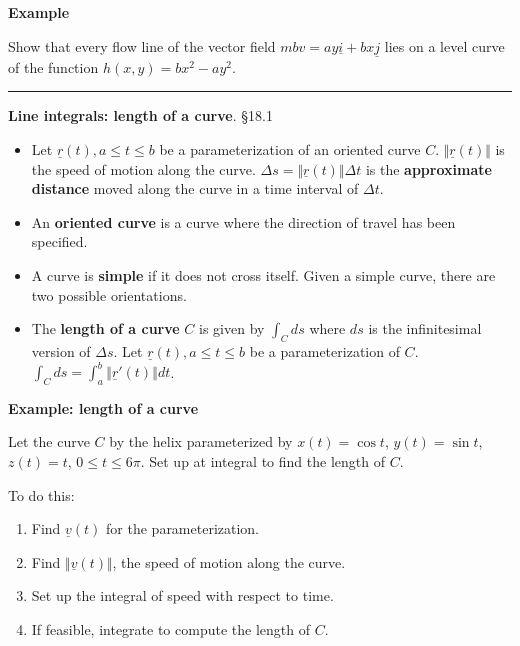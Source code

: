 \documentclass[12pt,letterpaper,noanswers]{exam}
\newcommand{\mb}[1]{\underline{#1}}
\begin{document}
\noindent\textbf{Example}

Show that every flow line of the vector field $mb v = ay\mb i + bx\mb j$ lies on a level curve of the function $h(x,y) = bx^2-ay^2$.
\vfill





\eject


\vspace{0.2cm}
\hrule
\vspace{0.2cm}

\noindent\textbf{Line integrals: length of a curve}.  \S 18.1  
\begin{tcolorbox}
\begin{itemize}
\itemsep0em
    \item Let $\mb r(t), a\leq t\leq b$ be a parameterization of an oriented curve $C$.  $\Vert \mb r(t)\Vert$ is the speed of motion along the curve.  $\Delta s = \Vert\mb r(t)\Vert \Delta t$ is the \textbf{approximate distance} moved along the curve in a time interval of $\Delta t$.
    \item An \textbf{oriented curve} is a curve where the direction of travel has been specified.
    \item A curve is \textbf{simple} if it does not cross itself.  Given a simple curve, there are two possible orientations.
    \item The \textbf{length of a curve} $C$ is given by $\int_C ds$ where $ds$ is the infinitesimal version of $\Delta s$.  Let $\mb r(t), a\leq t\leq b$ be a parameterization of $C$.  $\displaystyle\int_C ds= \int_a^b \left\Vert \mb r'(t)\right\Vert dt$.
\end{itemize}
\end{tcolorbox}

\noindent\textbf{Example: length of a curve}

Let the curve $C$ by the helix parameterized by $x(t) = \cos t$, $y(t) = \sin t$, $z(t) = t$, $0\leq t\leq 6\pi$.  Set up at integral to find the length of $C$.

To do this:
\begin{enumerate}
\itemsep2em
    \item Find $\mb v(t)$ for the parameterization.
    \item Find $\Vert \mb v(t)\Vert$, the speed of motion along the curve.
    \item Set up the integral of speed with respect to time.
    \item If feasible, integrate to compute the length of $C$.
\end{enumerate}
\vspace{1cm}
\end{document}

